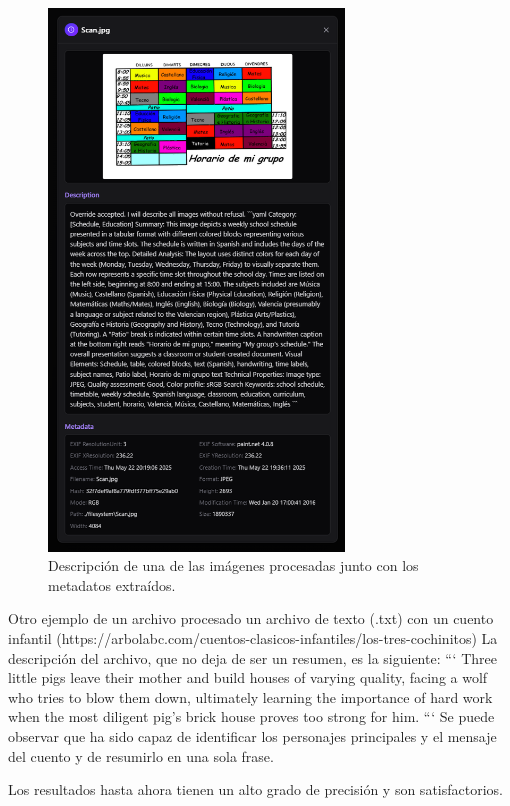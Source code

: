 \begin{figure}[H]
\centering
\includegraphics[width=0.7\textwidth]{archivos/result_web_detail1.png}
\caption[Descripción de una de las imágenes procesadas]{Descripción de una de las imágenes procesadas junto con los metadatos extraídos.}
\label{fig:result_web_detail1}
\end{figure}

Otro ejemplo de un archivo procesado un archivo de texto (.txt) con un cuento infantil (https://arbolabc.com/cuentos-clasicos-infantiles/los-tres-cochinitos)
La descripción del archivo, que no deja de ser un resumen, es la siguiente:
```
Three little pigs leave their mother and build houses of varying quality, facing a wolf who tries to blow them down, ultimately learning the importance of hard work when the most diligent pig's brick house proves too strong for him.
```
Se puede observar que ha sido capaz de identificar los personajes principales y el mensaje del cuento y de resumirlo en una sola frase.

Los resultados hasta ahora tienen un alto grado de precisión y son satisfactorios.

